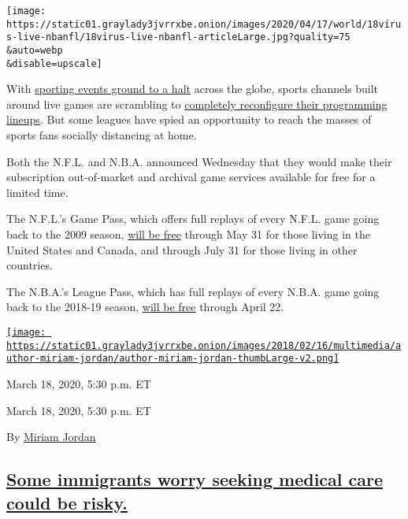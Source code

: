 \texttt{[image: https://static01.graylady3jvrrxbe.onion/images/2020/04/17/world/18virus-live-nbanfl/18virus-live-nbanfl-articleLarge.jpg?quality=75\\\&auto=webp\\\&disable=upscale]}

With
\href{https://www.nytimes3xbfgragh.onion/2020/03/12/sports/coronavirus-sports-canceled.html}{sporting
events ground to a halt} across the globe, sports channels built around
live games are scrambling to
\href{https://www.nytimes3xbfgragh.onion/2020/03/16/sports/sports-television-coronavirus.html}{completely
reconfigure their programming lineups}. But some leagues have spied an
opportunity to reach the masses of sports fans socially distancing at
home.

Both the N.F.L. and N.B.A. announced Wednesday that they would make
their subscription out-of-market and archival game services available
for free for a limited time.

The N.F.L.'s Game Pass, which offers full replays of every N.F.L. game
going back to the 2009 season,
\href{http://www.nfl.com/news/story/0ap3000001106855/article/nfl-offers-fans-free-access-to-nfl-game-pass}{will
be free} through May 31 for those living in the United States and
Canada, and through July 31 for those living in other countries.

The N.B.A.'s League Pass, which has full replays of every N.B.A. game
going back to the 2018-19 season,
\href{https://www.nba.com/nba-fan-letter-league-pass-free-preview}{will
be free} through April 22.

\href{https://www.nytimes3xbfgragh.onion/by/miriam-jordan/}{\texttt{[image: https://static01.graylady3jvrrxbe.onion/images/2018/02/16/multimedia/author-miriam-jordan/author-miriam-jordan-thumbLarge-v2.png]}}

March 18, 2020, 5:30 p.m. ET

March 18, 2020, 5:30 p.m. ET

By \href{https://www.nytimes3xbfgragh.onion/by/miriam-jordan/}{Miriam
Jordan}

\hypertarget{some-immigrants-worry-seeking-medical-care-could-be-risky}{%
\subsection{\texorpdfstring{\protect\hyperlink{some-immigrants-worry-seeking-medical-care-could-be-risky}{Some
immigrants worry seeking medical care could be
risky.}}{Some immigrants worry seeking medical care could be risky.}}\label{some-immigrants-worry-seeking-medical-care-could-be-risky}}

